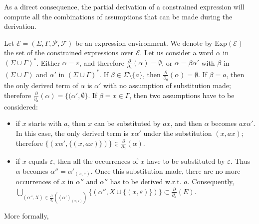 \documentclass[a4paper]{llncs}
\begin{document}
  As a direct consequence, the partial derivation of a constrained expression will compute all the combinations of assumptions that can be made during the derivation.



Let $\mathcal{E}=(\Sigma,\Gamma,\mathcal{P},\mathcal{F})$ be an expression environment.
  We denote by $\mathrm{Exp}(\mathcal{E})$ the set of the constrained expressions over $\mathcal{E}$. 
  Let us consider a word $\alpha$ in $(\Sigma\cup\Gamma)^*$.
  Either $\alpha=\varepsilon$, and therefore $\frac{\partial}{\partial_a}(\alpha)=\emptyset$, or $\alpha=\beta\alpha'$ with $\beta$ in $(\Sigma\cup\Gamma)$ and $\alpha'$ in $(\Sigma\cup\Gamma)^*$.
  If $\beta\in\Sigma\setminus\{a\}$, then $\frac{\partial}{\partial_a}(\alpha)=\emptyset$. 
  If $\beta=a$, then the only derived term of $\alpha$ is $\alpha'$ with no assumption of substitution made; therefore $\frac{\partial}{\partial_a}(\alpha)=\{(\alpha',\emptyset\}$.
  If $\beta=x\in\Gamma$, then two assumptions have to be considered:
  \begin{itemize}
    \item if $x$ starts with $a$, then $x$ can be substituted by $ax$, and then $\alpha$ becomes $ax\alpha'$. In this case, the only derived term is $x\alpha'$ under the substitution $(x,ax)$; therefore $\{(x\alpha',\{(x,ax)\})\}\in\frac{\partial}{\partial_a}(\alpha)$.
    \item if $x$ equals $\varepsilon$, then all the occurrences of $x$ have to be substituted by $\varepsilon$. 
    Thus $\alpha$ becomes $\alpha''=\alpha'_{(x,\varepsilon)}$. 
    Once this substitution made, there are no more occurrences of $x$ in $\alpha''$ and $\alpha''$ has to be derived w.r.t. $a$.
    Consequently, $\bigcup_{(\alpha'',X)\in\frac{\partial}{\partial_a}((\alpha')_{(x,\varepsilon)})} \{(\alpha'',X\cup\{(x,\varepsilon)\})\} \subset \frac{\partial}{\partial_a}(E)$.
  \end{itemize} 
  More formally,
\end{document}
